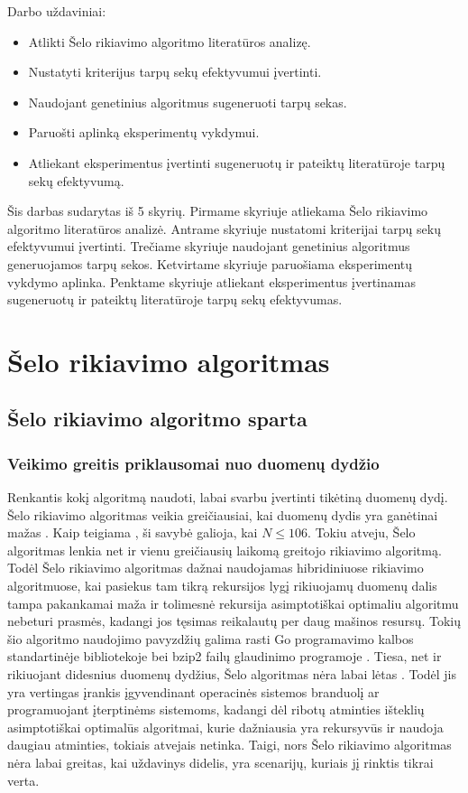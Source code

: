 \documentclass{VUMIFInfKursinis}
\begin{document}
Darbo uždaviniai:
\begin{itemize}
  \item Atlikti Šelo rikiavimo algoritmo literatūros analizę.
  \item Nustatyti kriterijus tarpų sekų efektyvumui įvertinti.
  \item Naudojant genetinius algoritmus sugeneruoti tarpų sekas.
  \item Paruošti aplinką eksperimentų vykdymui.
  \item Atliekant eksperimentus įvertinti sugeneruotų ir pateiktų literatūroje tarpų sekų efektyvumą.
\end{itemize}

Šis darbas sudarytas iš 5 skyrių.
Pirmame skyriuje atliekama Šelo rikiavimo algoritmo literatūros analizė.
Antrame skyriuje nustatomi kriterijai tarpų sekų efektyvumui įvertinti.
Trečiame skyriuje naudojant genetinius algoritmus generuojamos tarpų sekos.
Ketvirtame skyriuje paruošiama eksperimentų vykdymo aplinka.
Penktame skyriuje atliekant eksperimentus įvertinamas sugeneruotų ir pateiktų literatūroje tarpų sekų efektyvumas.

\section{Šelo rikiavimo algoritmas}

\subsection{Šelo rikiavimo algoritmo sparta}

\subsubsection{Veikimo greitis priklausomai nuo duomenų dydžio}

Renkantis kokį algoritmą naudoti, labai svarbu įvertinti tikėtiną duomenų dydį.
Šelo rikiavimo algoritmas veikia greičiausiai, kai duomenų dydis yra ganėtinai mažas \cite{ciura2001best}.
Kaip teigiama \cite{simpson1999faster}, ši savybė galioja, kai $N \leq 106$.
Tokiu atveju, Šelo algoritmas lenkia net ir vienu greičiausių laikomą greitojo rikiavimo algoritmą.
Todėl Šelo rikiavimo algoritmas dažnai naudojamas hibridiniuose rikiavimo algoritmuose, kai pasiekus tam tikrą rekursijos lygį
rikiuojamų duomenų dalis tampa pakankamai maža ir tolimesnė rekursija asimptotiškai optimaliu algoritmu nebeturi prasmės,
kadangi jos tęsimas reikalautų per daug mašinos resursų.
Tokių šio algoritmo naudojimo pavyzdžių galima rasti Go programavimo kalbos standartinėje bibliotekoje \cite{golangsort} bei
bzip2 failų glaudinimo programoje \cite{bzip2sort}.
Tiesa, net ir rikiuojant didesnius duomenų dydžius, Šelo algoritmas nėra labai lėtas \cite{ciura2001best}.
Todėl jis yra vertingas įrankis įgyvendinant operacinės sistemos branduolį ar programuojant įterptinėms sistemoms, kadangi dėl ribotų atminties išteklių
asimptotiškai optimalūs algoritmai, kurie dažniausia yra rekursyvūs ir naudoja daugiau atminties, tokiais atvejais netinka.
Taigi, nors Šelo rikiavimo algoritmas nėra labai greitas, kai uždavinys didelis,
yra scenarijų, kuriais jį rinktis tikrai verta.
\end{document}
